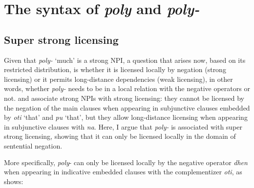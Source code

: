 \documentclass[output=paper]{langscibook}
\begin{document}
\section{The syntax of \textit{poly} and \textit{poly-}} \label{gia:sec:syntax}

\subsection{Super strong licensing} \label{gia:sub:super}

Given that \textit{poly-} `much' is a strong NPI, a question that arises now, based on its restricted distribution, is whether it is licensed locally by negation (strong licensing) or it permits long-distance dependencies (weak licensing), in other words, whether \textit{poly-} needs to be in a local relation with the negative operators or not. \citet{giannaki1995subj,giannaki1997dissert,giannaki1998} and \citet{giannakiquer1995,giannakiquer1997} associate strong NPIs with strong licensing: they cannot be licensed by the negation of the main clauses when appearing in subjunctive clauses embedded by \textit{oti} `that' and \textit{pu} `that', but they allow long-distance licensing when appearing in subjunctive clauses with \textit{na}. Here, I argue that \textit{poly-} is associated with super strong licensing, showing that it can only be licensed locally in the domain of sentential negation.

More specifically, \textit{poly}- can only be licensed locally by the negative operator \textit{dhen} when appearing in indicative embedded clauses with the complementizer \textit{oti}, as  shows:

\begin{exe}
\ex\label{gia:ex18} \begin{xlist}
        \label{gia:ex18b}
    \end{xlist}
\end{exe}
\end{document}
